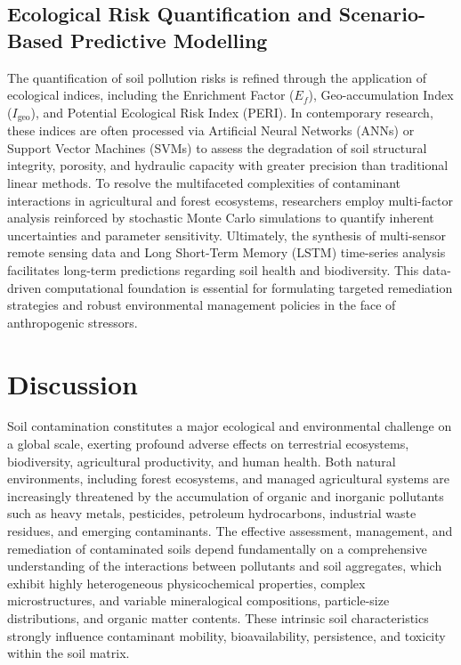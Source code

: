 \documentclass[preprint,12pt]{elsarticle}            %
\begin{document}
\subsection{Ecological Risk Quantification and Scenario-Based Predictive
    Modelling}\label{sec4.2}

The quantification of soil pollution risks is refined through the application
of ecological indices, including the Enrichment Factor ($E_f$),
Geo-accumulation Index ($I_{\text{geo}}$), and Potential Ecological Risk
Index (PERI). In contemporary research, these indices are often processed via
Artificial Neural Networks (ANNs) or Support Vector Machines (SVMs) to assess
the degradation of soil structural integrity, porosity, and hydraulic capacity
with greater precision than traditional linear methods. To resolve the
multifaceted complexities of contaminant interactions in agricultural and
forest ecosystems, researchers employ multi-factor analysis reinforced by
stochastic Monte Carlo simulations to quantify inherent uncertainties and
parameter sensitivity. Ultimately, the synthesis of multi-sensor remote
sensing data and Long Short-Term Memory (LSTM) time-series analysis
facilitates long-term predictions regarding soil health and biodiversity. This
data-driven computational foundation is essential for formulating targeted
remediation strategies and robust environmental management policies in the
face of anthropogenic stressors.

\section{Discussion}\label{sec5}

Soil contamination constitutes a major ecological and environmental challenge
on a global scale, exerting profound adverse effects on terrestrial
ecosystems, biodiversity, agricultural productivity, and human health. Both
natural environments, including forest ecosystems, and managed agricultural
systems are increasingly threatened by the accumulation of organic and
inorganic pollutants such as heavy metals, pesticides, petroleum hydrocarbons,
industrial waste residues, and emerging contaminants. The effective assessment,
management, and remediation of contaminated soils depend fundamentally on a
comprehensive understanding of the interactions between pollutants and soil
aggregates, which exhibit highly heterogeneous physicochemical properties,
complex microstructures, and variable mineralogical compositions, particle-size
distributions, and organic matter contents. These intrinsic soil
characteristics strongly influence contaminant mobility, bioavailability,
persistence, and toxicity within the soil matrix.
\end{document}
